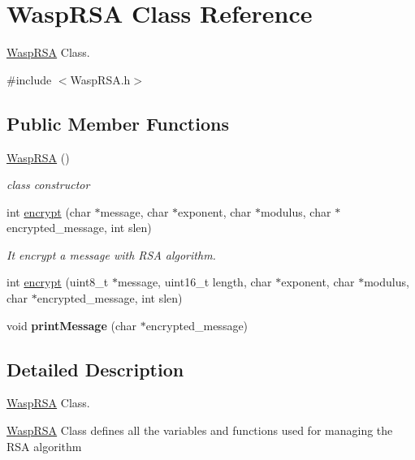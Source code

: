 \hypertarget{class_wasp_r_s_a}{}\section{Wasp\+R\+SA Class Reference}
\label{class_wasp_r_s_a}


\hyperlink{class_wasp_r_s_a}{Wasp\+R\+SA} Class.  




{\ttfamily \#include $<$Wasp\+R\+S\+A.\+h$>$}

\subsection*{Public Member Functions}
\begin{DoxyCompactItemize}
\item 
\hyperlink{class_wasp_r_s_a_af1707e0a117ed4d78494cd830ad58c05}{Wasp\+R\+SA} ()
\begin{DoxyCompactList}\small\item\em class constructor \end{DoxyCompactList}\item 
int \hyperlink{class_wasp_r_s_a_ae8e6ec90330e2a39ec481a2f31da077a}{encrypt} (char $\ast$message, char $\ast$exponent, char $\ast$modulus, char $\ast$encrypted\+\_\+message, int slen)
\begin{DoxyCompactList}\small\item\em It encrypt a message with R\+SA algorithm. \end{DoxyCompactList}\item 
int \hyperlink{class_wasp_r_s_a_a1b5e867114d3ce36a9320bef1b31dec8}{encrypt} (uint8\+\_\+t $\ast$message, uint16\+\_\+t length, char $\ast$exponent, char $\ast$modulus, char $\ast$encrypted\+\_\+message, int slen)
\item 
void {\bfseries print\+Message} (char $\ast$encrypted\+\_\+message)\hypertarget{class_wasp_r_s_a_a59c8a1bc52d6cab1ea5ba13278f1e71b}{}\label{class_wasp_r_s_a_a59c8a1bc52d6cab1ea5ba13278f1e71b}

\end{DoxyCompactItemize}


\subsection{Detailed Description}
\hyperlink{class_wasp_r_s_a}{Wasp\+R\+SA} Class. 

\hyperlink{class_wasp_r_s_a}{Wasp\+R\+SA} Class defines all the variables and functions used for managing the R\+SA algorithm 

